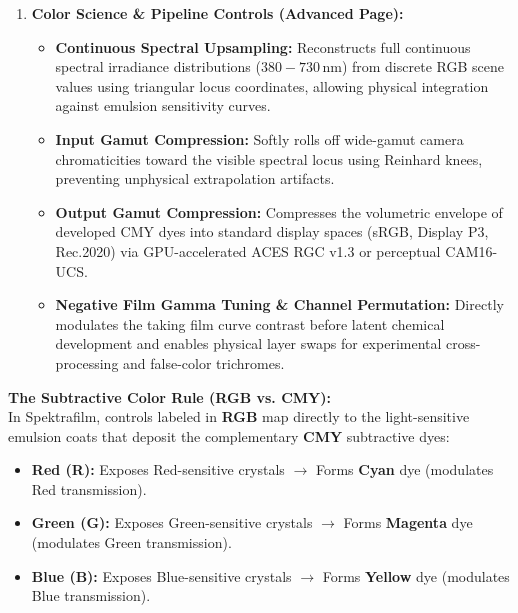\documentclass[11pt,a4paper]{article}
\begin{document}
\begin{enumerate}[leftmargin=*]
    \item \textbf{Color Science \& Pipeline Controls (Advanced Page):}
    \begin{itemize}
        \item \textbf{Continuous Spectral Upsampling:} Reconstructs full continuous spectral irradiance distributions ($380 - 730\,\text{nm}$) from discrete RGB scene values using triangular locus coordinates, allowing physical integration against emulsion sensitivity curves.
        \item \textbf{Input Gamut Compression:} Softly rolls off wide-gamut camera chromaticities toward the visible spectral locus using Reinhard knees, preventing unphysical extrapolation artifacts.
        \item \textbf{Output Gamut Compression:} Compresses the volumetric envelope of developed CMY dyes into standard display spaces (sRGB, Display P3, Rec.2020) via GPU-accelerated ACES RGC v1.3 or perceptual CAM16-UCS.
        \item \textbf{Negative Film Gamma Tuning \& Channel Permutation:} Directly modulates the taking film curve contrast before latent chemical development and enables physical layer swaps for experimental cross-processing and false-color trichromes.
    \end{itemize}
\end{enumerate}

\begin{tcolorbox}
\textbf{The Subtractive Color Rule (RGB vs. CMY):}\\
In Spektrafilm, controls labeled in \textbf{RGB} map directly to the light-sensitive emulsion coats that deposit the complementary \textbf{CMY} subtractive dyes:
\begin{itemize}[leftmargin=1.5em]
    \item \textbf{Red (R):} Exposes Red-sensitive crystals $\longrightarrow$ Forms \textbf{Cyan} dye (modulates Red transmission).
    \item \textbf{Green (G):} Exposes Green-sensitive crystals $\longrightarrow$ Forms \textbf{Magenta} dye (modulates Green transmission).
    \item \textbf{Blue (B):} Exposes Blue-sensitive crystals $\longrightarrow$ Forms \textbf{Yellow} dye (modulates Blue transmission).
\end{itemize}
\end{tcolorbox}

\newpage

\end{document}
